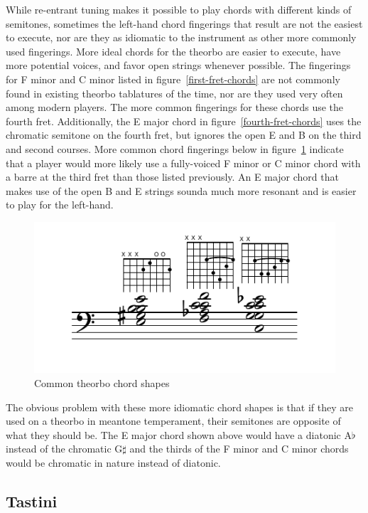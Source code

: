 While re-entrant tuning makes it possible to play chords with different kinds of
semitones, sometimes the left-hand chord fingerings that result are not the easiest to
execute, nor are they as idiomatic to the instrument as other more commonly used
fingerings. More ideal chords for the theorbo are easier to execute, have more potential
voices, and favor open strings whenever possible.  The fingerings for F
minor and C minor listed in figure~\ref{first-fret-chords} are not commonly found in
existing theorbo tablatures of the time, nor are they used very often among modern
players. The more common fingerings for these chords use the fourth fret.
Additionally, the E major chord in figure~\ref{fourth-fret-chords} uses the chromatic
semitone on the fourth fret, but ignores the open E and B on the third and second
courses. More common chord fingerings below in figure~\ref{common-chords} indicate that
a player would more likely use a fully-voiced F minor or C minor chord with a barre at
the third fret than those listed previously.  An E major chord that makes use of the
open B and E strings sounda much more resonant and is easier to play for the left-hand.
\begin{figure}[h]
\centering
\includegraphics{examples/common-chords.pdf}
\caption{Common theorbo chord shapes}
\label{common-chords}
\end{figure}
The obvious problem with these more idiomatic chord shapes is that if they are used on
a theorbo in meantone temperament, their semitones are opposite of what they should be.
The E major chord shown above would have a diatonic A$\flat$ instead of the chromatic
G$\sharp$ and the thirds of the F minor and C minor chords would be chromatic in nature
instead of diatonic.

\subsection{Tastini}

